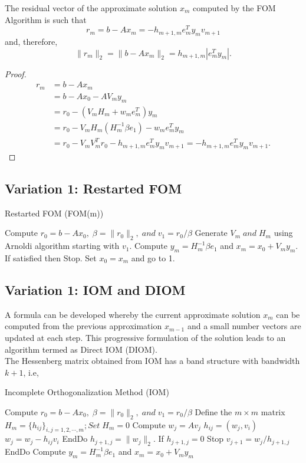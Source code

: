 \documentclass[10pt,a4paper]{article}
\begin{document}
\begin{proposition}
The residual vector of the approximate solution $x_m$ computed by the FOM Algorithm is such that 
$$r_m=b-Ax_m=-h_{m+1,m}e^T_my_mv_{m+1}$$
and, therefore,
$$\|r_m\|_2=\|b-Ax_m\|_2=h_{m+1,m}|e^T_my_m|.$$

\begin{proof}
\begin{align*}
r_m&=b-Ax_m \\
&= b-Ax_0-AV_my_m \\
&= r_0 - (V_mH_m+w_me^T_m)y_m \\
&= r_0 - V_mH_m(H^{-1}_m\beta e_1) - w_me^T_my_m \\
&= r_0 - V_mV^T_mr_0 - h_{m+1,m}e^T_my_mv_{m+1}=-h_{m+1,m}e^T_my_mv_{m+1}.
\end{align*}
\end{proof}
\end{proposition}

\subsection{Variation 1: Restarted FOM}

\begin{algorithm}
\caption{Restarted FOM (FOM(m))}
\begin{algorithmic}[1]
\State Compute $r_0=b-Ax_0,\;\beta=\|r_0\|_2,\;and\;v_1=r_0/\beta$
\State Generate $V_m\;and\;H_m$ using Arnoldi algorithm starting with $v_1$.
\State Compute $y_m=H^{-1}_m\beta e_1$ and $x_m=x_0+V_my_m$. If satisfied then Stop.
\State Set $x_0=x_m$ and go to 1.
\end{algorithmic}
\end{algorithm}

\subsection{Variation 1: IOM and DIOM}

A formula can be developed whereby the current approximate solution $x_m$ can be computed from the previous approximation $x_{m-1}$ and a small number vectors are updated at each step. This progressive formulation of the solution leads to an algorithm termed as Direct IOM (DIOM).\\
The Hessenberg matrix obtained from IOM has a band structure with bandwidth $k+1$, i.e,

\begin{algorithm}
\caption{Incomplete Orthogonalization Method (IOM)}
\begin{algorithmic}[1]
\State Compute $r_0=b-Ax_0,\;\beta=\|r_0\|_2,\;and\;v_1=r_0/\beta$
\State Define the $m\times m$ matrix $H_m = \{h_{ij}\}_{i,j=1,2,\cdots,m};Set\;H_m=0$
	\State Compute $w_j = Av_j$
		\State $h_{ij} = (w_j,v_i)$
		\State $w_j = w_j - h_{ij}v_i$
	\EndFor
	\State EndDo
	\State $h_{j+1,j} = \|w_j\|_2$. If $h_{j+1,j}=0$ Stop
	\State $v_{j+1}=w_j/h_{j+1,j}$
\EndFor
\State EndDo
\State Compute $y_m=H^{-1}_m\beta e_1$ and $x_m=x_0+V_my_m$
\end{algorithmic}
\end{algorithm}
\end{document}
